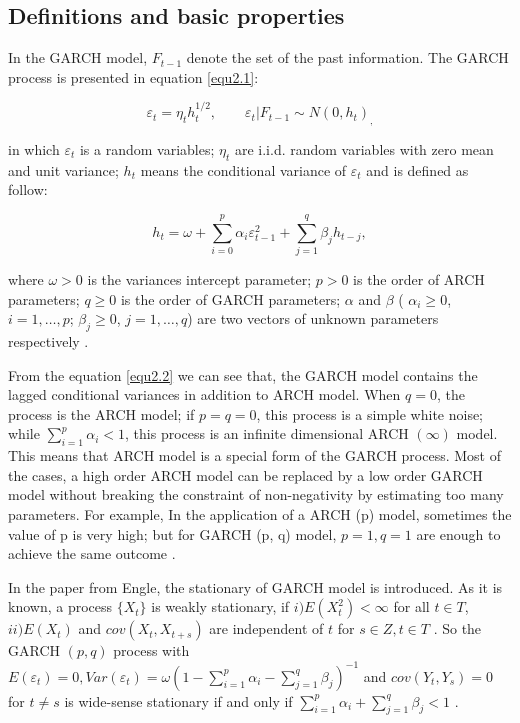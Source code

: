 \subsection{Definitions and basic properties}
In the GARCH model, $F_{t-1}$ denote the set of the past information. The GARCH process is presented in equation \ref{equ2.1}:

\begin{equation} 
\label{equ2.1}
	\varepsilon_t =  \eta_t h_t^{1/2},    \qquad    \varepsilon_{t}|F_{t-1}\sim N(0,h_{t})_,
 \end{equation} 
 
in which $\varepsilon_t$ is a random variables; $\eta_t$ are i.i.d. random  variables with zero mean and unit variance; $h_{t}$ means the conditional variance of $\varepsilon_{t}$ and is defined as follow:

\begin{equation}
\label{equ2.2} 
h_t = \omega + \sum_{i=0}^p \alpha_i \varepsilon_{t-1}^2 + \sum_{j=1}^q\beta_j h_{t-j},
\end{equation} 

where $\omega>0$ is the variances intercept parameter; $p>0$ is the order of ARCH parameters; $q \geq 0$ is the order of GARCH parameters; $\alpha$ and $\beta$ ( $ \alpha_i \geq 0$, $i=1, \dots ,p$; $\beta_j \geq 0$, $j=1,\dots,q$) are two vectors of unknown parameters respectively \citep{Bollerslev1986}.

From the equation \ref{equ2.2} we can see that, the GARCH model contains the lagged conditional variances in addition to ARCH model. When  $q=0$, the process is the ARCH model; if $ p = q = 0$, this process is a simple white noise; while $\sum_{i=1}^p\alpha_i <1$, this process is an infinite dimensional ARCH  $(\infty)$ model. This means that ARCH model is a special form of the GARCH process. Most of the cases, a high order ARCH model can be replaced by a low order GARCH model without breaking the constraint of non-negativity by estimating too many parameters. For example, In the application of a ARCH (p) model, sometimes the value of p is very high; but for GARCH (p, q) model, $p=1, q=1$ are enough to achieve the same outcome \citep{Engle1986}.


In the paper from Engle, the stationary of GARCH model is introduced. As it is known, a process $\lbrace X_{t} \rbrace$  is weakly stationary,  if $i) E(X_{t}^{2}) < \infty$  for all  $t \in T$, $ ii) E(X_{t})$  and $cov(X_t,X_{t+s})$  are independent of $t$ for $s \in Z, t \in T$ \citep{Bougerol1992}. So the GARCH $(p,q)$ process with $E\left( \varepsilon_t \right) =0, Var(\varepsilon_t) = \omega(1-  \sum_{i=1}^p\alpha_i - \sum_{j=1}^q\beta_j )^{-1}$ and $cov(Y_t,Y_s)=0$ for $t \neq s$ is wide-sense stationary if and only if $\sum_{i=1}^p\alpha_i + \sum_{j=1}^q\beta_j < 1 $ \citep{Bollerslev1986}.

